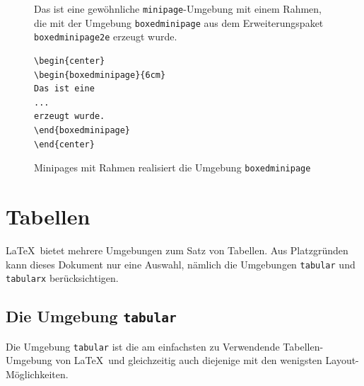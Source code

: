 \documentclass[a4paper,10pt,twoside]{scrbook}
\begin{document}
\begin{figure}[H]
\begin{minipage}[c]{.5\textwidth}
\setlength{\parskip}{1em}
\begin{center}
\begin{boxedminipage}{6cm}
Das ist eine gewöhnliche \verb!minipage!-Umgebung mit 
einem Rahmen, die mit der Umgebung \verb!boxedminipage! aus dem Erweiterungspaket \verb!boxedminipage2e! erzeugt wurde.
\end{boxedminipage}
\end{center}
\end{minipage}
\hfill
\begin{minipage}{.48\textwidth}
\setlength{\parskip}{1em}
\begin{lstlisting}[label=boxedminipagebeispiel, style=customlatex]
\begin{center}
\begin{boxedminipage}{6cm}
Das ist eine 
...
erzeugt wurde.
\end{boxedminipage}
\end{center}
\end{lstlisting}
\end{minipage}
\caption{Minipages mit Rahmen realisiert die Umgebung \texttt{boxedminipage}}
\label{Beispiel_boxedminipage}
\end{figure}



\chapter{Tabellen}
\label{Kapitel_Tabellen}

\LaTeX\ bietet mehrere Umgebungen zum Satz von Tabellen. Aus Platzgründen kann dieses Dokument nur eine Auswahl, nämlich die Umgebungen \verb!tabular!
und \verb!tabularx! berücksichtigen.



\section{Die Umgebung \texttt{tabular}}

Die Umgebung \verb!tabular! ist 
die am einfachsten zu Verwendende Tabellen-Umgebung von \LaTeX\ und gleichzeitig 
auch diejenige mit den wenigsten Layout-Möglichkeiten. 

\end{document}
